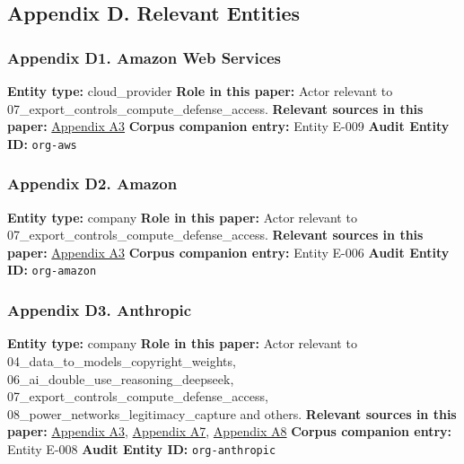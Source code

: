 \documentclass[
  american,
  11pt,
  letterpaper,
]{article}
\begin{document}
\subsection{Appendix D. Relevant
Entities}\label{appendix-d.-relevant-entities}

\subsubsection{Appendix D1. Amazon Web
Services}\label{appendix-d1-amazon-web-services}

\textbf{Entity type:} cloud\_provider \textbf{Role in this paper:} Actor
relevant to 07\_export\_controls\_compute\_defense\_access.
\textbf{Relevant sources in this paper:}
\hyperref[appendix-a3-amazon-and-anthropic-announce-strategic-collaboration-to-advance-generative-ai]{Appendix
A3} \textbf{Corpus companion entry:} Entity E-009 \textbf{Audit Entity
ID:} \texttt{org-aws}

\subsubsection{Appendix D2. Amazon}\label{appendix-d2-amazon}

\textbf{Entity type:} company \textbf{Role in this paper:} Actor
relevant to 07\_export\_controls\_compute\_defense\_access.
\textbf{Relevant sources in this paper:}
\hyperref[appendix-a3-amazon-and-anthropic-announce-strategic-collaboration-to-advance-generative-ai]{Appendix
A3} \textbf{Corpus companion entry:} Entity E-006 \textbf{Audit Entity
ID:} \texttt{org-amazon}

\subsubsection{Appendix D3. Anthropic}\label{appendix-d3-anthropic}

\textbf{Entity type:} company \textbf{Role in this paper:} Actor
relevant to 04\_data\_to\_models\_copyright\_weights,
06\_ai\_double\_use\_reasoning\_deepseek,
07\_export\_controls\_compute\_defense\_access,
08\_power\_networks\_legitimacy\_capture and others. \textbf{Relevant
sources in this paper:}
\hyperref[appendix-a3-amazon-and-anthropic-announce-strategic-collaboration-to-advance-generative-ai]{Appendix
A3},
\hyperref[appendix-a7-claude-gov-models-for-u-s-national-security-customers]{Appendix
A7},
\hyperref[appendix-a8-anthropic-and-palantir-partner-to-bring-claude-ai-models-to-aws-for-u-s-government-intelligence-and-defense-operations]{Appendix
A8} \textbf{Corpus companion entry:} Entity E-008 \textbf{Audit Entity
ID:} \texttt{org-anthropic}
\end{document}

